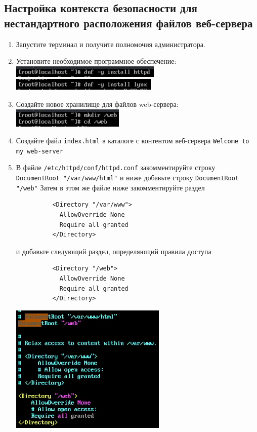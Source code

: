 \documentclass[12pt]{article}
\begin{document}
\subsection{Настройка контекста безопасности для нестандартного расположения файлов веб-сервера}
\begin{enumerate}
	\item Запустите терминал и получите полномочия администратора.
	\item Установите необходимое программное обеспечение:
	      \\\includegraphics{15.png}
	      \\\includegraphics{15_1.png}
	\item Создайте новое хранилище для файлов web-сервера:
	      \\\includegraphics{16.png}
	\item Создайте файл \texttt{index.html} в каталоге с контентом веб-сервера \texttt{Welcome to my web-server}
	\item В файле \texttt{/etc/httpd/conf/httpd.conf} закомментируйте строку \texttt{DocumentRoot "/var/www/html"} и ниже добавьте строку \texttt{DocumentRoot "/web"} Затем в этом же файле ниже закомментируйте раздел \\
	      \begin{verbatim}
          <Directory "/var/www">
            AllowOverride None
            Require all granted
          </Directory>
        \end{verbatim}
	      и добавьте следующий раздел, определяющий правила доступа \\
	      \begin{verbatim}
          <Directory "/web">
            AllowOverride None
            Require all granted
          </Directory>
        \end{verbatim}
	      \includegraphics{17.png}

\end{enumerate}
\end{document}
